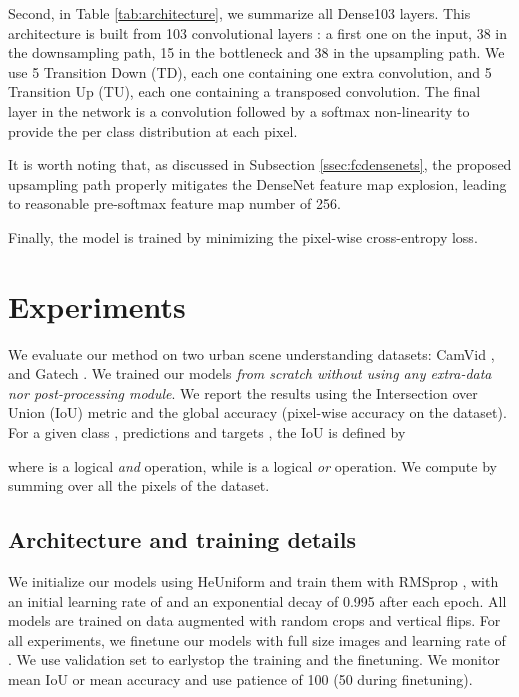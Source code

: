 \documentclass[10pt,twocolumn,letterpaper]{article}
\begin{document}
Second, in Table \ref{tab:architecture}, we summarize all Dense103 layers. This architecture is built from 103 convolutional layers : a first one on the input, 38 in the downsampling path, 15 in the bottleneck and 38 in the upsampling path. We use 5 Transition Down (TD), each one containing one extra convolution, and 5 Transition Up (TU), each one containing a transposed convolution. The final layer in the network is a  convolution followed by a softmax non-linearity to provide the per class distribution at each pixel. 

It is worth noting that, as discussed in Subsection \ref{ssec:fcdensenets}, the proposed upsampling path properly mitigates the DenseNet feature map explosion, leading to reasonable pre-softmax feature map number of 256.

Finally, the model is trained by minimizing the pixel-wise cross-entropy loss.

\section{Experiments}
\label{sec:experiments} 
We evaluate our method on two urban scene understanding datasets: CamVid \cite{camvid}, and Gatech \cite{Gatech}. We trained our models \emph{from scratch without using any extra-data nor post-processing module}. We report the results using the Intersection over Union (IoU) metric and the global accuracy (pixel-wise accuracy on the dataset). For a given class , predictions  and targets , the IoU is defined by 

where  is a logical \textit{and} operation, while  is a logical \textit{or} operation. We compute  by summing over all the pixels  of the dataset.

\subsection{Architecture and training details}
\label{ssec:details}

We initialize our models using HeUniform \cite{HeZR015} and train them with RMSprop \cite{rmsprop}, with an initial learning rate of  and an exponential decay of 0.995 after each epoch. All models are trained on data augmented with random crops and vertical flips. For all experiments, we finetune our models with full size images and learning rate of . We use validation set to earlystop the training and the finetuning. We monitor mean IoU or mean accuracy and use patience of 100 (50 during finetuning). 
\end{document}
